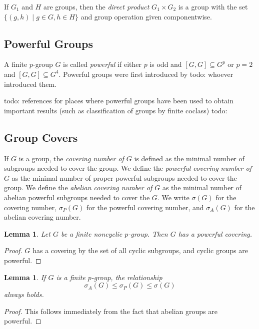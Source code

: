 \documentclass{amsart}
\numberwithin{equation} {section}
\newtheorem{lemma}[equation]{Lemma}
\theoremstyle{definition}
\begin{document}
If $G_1$ and $H$ are groups, then the \textit{direct product} $G_1 \times G_2$ is a group with the set $\{ (g,h) \mid g \in G, h \in H \} $ and group operation given componentwise.

\subsection{Powerful Groups}

A finite $p$-group $G$ is called \textit{powerful} if either $p$ is odd and $[G,G]\subseteq G^p$ or $p=2$ and $[G,G]\subseteq G^4$. Powerful groups were first introduced by todo: whoever introduced them.  

todo: references for places where powerful groups have been used to obtain important results (such as classification of groups by finite coclass)
todo: 

\subsection{Group Covers}

If $G$ is a group,  the \textit{covering number of $G$} is defined as the minimal number of subgroups needed to cover the group. We define the \textit{powerful covering number of $G$} as the minimal number of proper powerful subgroups needed to cover the group. We define the \textit{abelian covering number of $G$} as the minimal number of abelian powerful subgroups needed to cover the $G$. We write $\sigma(G)$ for the covering number, $\sigma_P(G)$ for the powerful covering number, and $\sigma_A(G)$ for the abelian covering number. 

\begin{lemma}\label{l:all-p-groups-have-powerful-covers}
Let $G$ be a finite noncyclic $p$-group. Then $G$ has a powerful covering.
\end{lemma}

\begin{proof}
$G$ has a covering by the set of all cyclic subgroups, and cyclic groups are powerful. 
\end{proof}

\begin{lemma}\label{l:powerful-abelian-covering-relationship}
If $G$ is a finite $p$-group, the relationship
\[
\sigma_{A}(G) \leq \sigma_{P}(G) \leq \sigma(G)
\]
always holds. 
\end{lemma}

\begin{proof}
This follows immediately from the fact that abelian groups are powerful. 
\end{proof}
\end{document}
